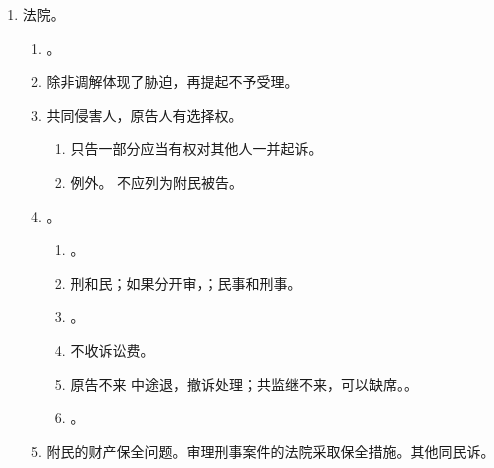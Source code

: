 \begin{enumerate}
\begin{enumerate}
                \begin{enumerate}
                  \item {}。
                  \item {}，应当及时调解书，生效。
                  \item 当庭执行完毕的，调解书，。经签名或盖章生效。
                  \item {}协议或者调解书签收前当事人的，应当同刑事诉讼。
                \end{enumerate}
        \end{enumerate}
  \item 法院。
        \begin{enumerate}
          \item {}。
          \item 除非调解体现了胁迫，再提起不予受理。
          \item 共同侵害人，原告人有选择权。
                \begin{enumerate}
                  \item 只告一部分应当有权对其他人一并起诉。
                  \item 例外。 \yjt 不应列为附民被告。
                \end{enumerate}
          \item {}。
                \begin{enumerate}
                  \item {}。
                  \item 刑和民；如果分开审，；民事和刑事。
                  \item {}。
                  \item 不收诉讼费。
                  \item 原告不来 \hz 中途退，撤诉处理；共监继不来，可以缺席。。
                  \item {}。
                \end{enumerate}
          \item 附民的财产保全问题。审理刑事案件的法院采取保全措施。其他同民诉。

\end{enumerate}
\end{enumerate}
